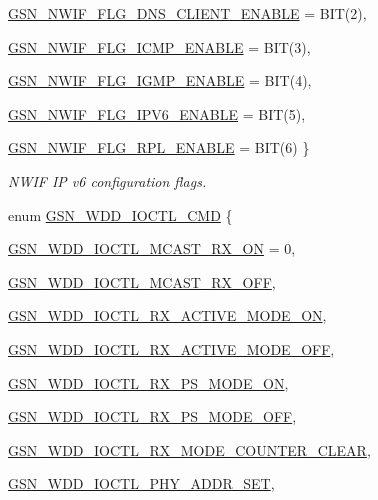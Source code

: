 \begin{DoxyCompactItemize}
\hyperlink{a00670_ggaa0ec94e77c73c9648888a870bd0f041aae868de24a703223a0d1e00aa33f83531}{GSN\_\-NWIF\_\-FLG\_\-DNS\_\-CLIENT\_\-ENABLE} =  BIT(2), 
\par
\hyperlink{a00670_ggaa0ec94e77c73c9648888a870bd0f041aa349cb4e40a71e0a0419792354d68a10d}{GSN\_\-NWIF\_\-FLG\_\-ICMP\_\-ENABLE} =  BIT(3), 
\par
\hyperlink{a00670_ggaa0ec94e77c73c9648888a870bd0f041aaf1e3613168c79494813f43bd2fd779db}{GSN\_\-NWIF\_\-FLG\_\-IGMP\_\-ENABLE} =  BIT(4), 
\par
\hyperlink{a00670_ggaa0ec94e77c73c9648888a870bd0f041aa3d237bb1f68c4dc2e7c4774cd71ce30c}{GSN\_\-NWIF\_\-FLG\_\-IPV6\_\-ENABLE} =  BIT(5), 
\par
\hyperlink{a00670_ggaa0ec94e77c73c9648888a870bd0f041aa9291be9bc46fefc2f9309978d2211765}{GSN\_\-NWIF\_\-FLG\_\-RPL\_\-ENABLE} =  BIT(6)
 \}
\begin{DoxyCompactList}\small\item\em NWIF IP v6 configuration flags. \end{DoxyCompactList}\item 
enum \hyperlink{a00670_gaf67ac3e77c7a5742b9b0bc7672529533}{GSN\_\-WDD\_\-IOCTL\_\-CMD} \{ \par
\hyperlink{a00670_ggaf67ac3e77c7a5742b9b0bc7672529533a90643fa9ea5beb1e71ac9dc1fc53cec9}{GSN\_\-WDD\_\-IOCTL\_\-MCAST\_\-RX\_\-ON} =  0, 
\par
\hyperlink{a00670_ggaf67ac3e77c7a5742b9b0bc7672529533a05ac24f3b915cf763e622bcbb05b3f4f}{GSN\_\-WDD\_\-IOCTL\_\-MCAST\_\-RX\_\-OFF}, 
\par
\hyperlink{a00670_ggaf67ac3e77c7a5742b9b0bc7672529533a60c5f074f918453013d7c738761add62}{GSN\_\-WDD\_\-IOCTL\_\-RX\_\-ACTIVE\_\-MODE\_\-ON}, 
\par
\hyperlink{a00670_ggaf67ac3e77c7a5742b9b0bc7672529533aff1d4dffa5b49df8c650ace2823be8b1}{GSN\_\-WDD\_\-IOCTL\_\-RX\_\-ACTIVE\_\-MODE\_\-OFF}, 
\par
\hyperlink{a00670_ggaf67ac3e77c7a5742b9b0bc7672529533a4eadb52c59da5af23a4976dca90f2d73}{GSN\_\-WDD\_\-IOCTL\_\-RX\_\-PS\_\-MODE\_\-ON}, 
\par
\hyperlink{a00670_ggaf67ac3e77c7a5742b9b0bc7672529533ac24a8e559457d883784645d80c09d27d}{GSN\_\-WDD\_\-IOCTL\_\-RX\_\-PS\_\-MODE\_\-OFF}, 
\par
\hyperlink{a00670_ggaf67ac3e77c7a5742b9b0bc7672529533a8a81d1c493fdcdc77180b01c800a206a}{GSN\_\-WDD\_\-IOCTL\_\-RX\_\-MODE\_\-COUNTER\_\-CLEAR}, 
\par
\hyperlink{a00670_ggaf67ac3e77c7a5742b9b0bc7672529533a36fc54ac07dd47f6d6b86b07a41ace72}{GSN\_\-WDD\_\-IOCTL\_\-PHY\_\-ADDR\_\-SET}, 

\end{DoxyCompactItemize}
